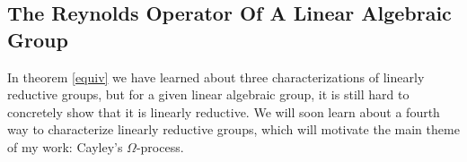 \subsection{The Reynolds Operator Of A Linear Algebraic Group}



In theorem \ref{equiv} we have learned about three characterizations of linearly reductive groups, but for a given linear algebraic group, it is still hard to concretely show that it is linearly reductive.
We will soon learn about a fourth way to characterize linearly reductive groups, which will motivate the main theme of my work:  Cayley's $\Omega$-process.

